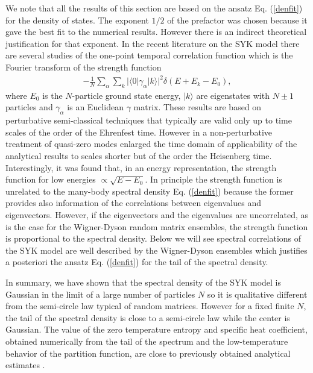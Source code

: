 \documentclass[aps,showpacs,floatfix,superscriptaddress,pre,11pt]{revtex4-1}
\newcommand{\be}{\begin{eqnarray}}
\newcommand{\ee}{\end{eqnarray}}
\begin{document}
   
We note that all the results of this section are based on the ansatz Eq. (\ref{denfit}) for the density of states. The exponent $1/2$ of the prefactor was chosen because it gave the best fit to the numerical results. However there is an indirect theoretical justification for that exponent.
In the recent literature on the SYK model there are several studies \cite{kitaev2015,maldacena2016,polchinski2016,jevicki2016} of the one-point temporal correlation function which is the Fourier transform
of the strength function
\be
-\frac 1N \sum_\alpha \sum_k |\langle 0|\gamma_\alpha|k\rangle|^2 \delta(E +E_k-E_0),
\ee
where $E_0$ is the $N$-particle ground state energy, $|k\rangle$ are eigenstates with $N\pm 1$
particles and $\gamma_\alpha$ is an Euclidean $\gamma$ matrix. These results are based on perturbative semi-classical techniques that typically are valid only up to time scales of the
order of the Ehrenfest time. However in \cite{bagrets2016} a non-perturbative treatment of quasi-zero modes enlarged the time domain of applicability of the analytical results to scales shorter but of the order the Heisenberg time. Interestingly, it was found \cite{bagrets2016} that, in an energy representation, the strength function for low energies $\propto \sqrt{E-E_0}$.
In principle the strength function is unrelated to the many-body spectral density Eq. (\ref{denfit}) because the former provides also information of the correlations between eigenvalues and eigenvectors. However,
if the eigenvectors and the eigenvalues are uncorrelated, as is the 
case for the
Wigner-Dyson random matrix ensembles, the strength function is proportional to the
spectral density.
Below we will see spectral correlations of the SYK model are well described by the Wigner-Dyson ensembles which justifies a posteriori the ansatz Eq. (\ref{denfit}) for the tail of the spectral density.


In summary, we have shown that the spectral density of the SYK model is Gaussian in
the  limit of a large number of particles $N$ so it is qualitative different from the semi-circle law typical of random matrices. However for a fixed finite $N$, the tail of the spectral density is close to a semi-circle law while the center is Gaussian.
The value of the zero temperature entropy and specific heat coefficient, obtained numerically from the tail of the spectrum and the low-temperature behavior of the partition function, are close
to previously obtained analytical estimates \cite{maldacena2016,jevicki2016}. 
   
\end{document}
